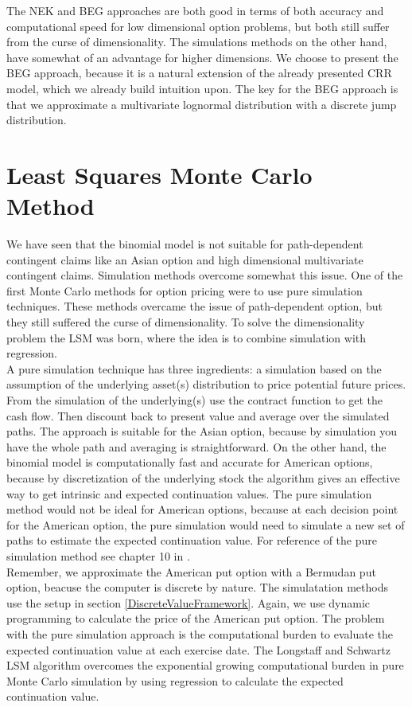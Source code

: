 The NEK and BEG approaches are both good in terms of both accuracy and computational speed for low dimensional option problems, but both still suffer from the curse of dimensionality. The simulations methods on the other hand, have somewhat of an advantage for higher dimensions. We choose to present the BEG approach, because it is a natural extension of the already presented CRR model, which we already build intuition upon. The key for the BEG approach is that we approximate a multivariate lognormal distribution with a discrete jump distribution. 

\newpage

\section{Least Squares Monte Carlo Method}\label{LSM}
We have seen that the binomial model is not suitable for path-dependent contingent claims like an Asian option and high dimensional multivariate contingent claims. Simulation methods overcome somewhat this issue. One of the first Monte Carlo methods for option pricing were to use pure simulation techniques. These methods overcame the issue of path-dependent option, but they still suffered the curse of dimensionality. To solve the dimensionality problem the LSM was born, where the idea is to combine simulation with regression. \\

A pure simulation technique has three ingredients: a simulation based on the assumption of the underlying asset(s) distribution to price potential future prices. From the simulation of the underlying(s) use the contract function to get the cash flow. Then discount back to present value and average over the simulated paths. The approach is suitable for the Asian option, because by simulation you have the whole path and averaging is straightforward. On the other hand, the binomial model is computationally fast and accurate for American options, because by discretization of the underlying stock the algorithm gives an effective way to get intrinsic and expected continuation values. The pure simulation method would not be ideal for American options, because at each decision point for the American option, the pure simulation would need to simulate a new set of paths to estimate the expected continuation value. For reference of the pure simulation method see chapter 10 in \parencite{OVERHAUSMARCUS2007EHD}.\\ 

Remember, we approximate the American put option with a Bermudan put option, beacuse the computer is discrete by nature. The simulatation methods use the setup in section \ref{DiscreteValueFramework}. Again, we use dynamic programming to calculate the price of the American put option. The problem with the pure simulation approach is the computational burden to evaluate the expected continuation value at each exercise date. The Longstaff and Schwartz LSM algorithm overcomes the exponential growing computational burden in pure Monte Carlo simulation by using regression to calculate the expected continuation value.

